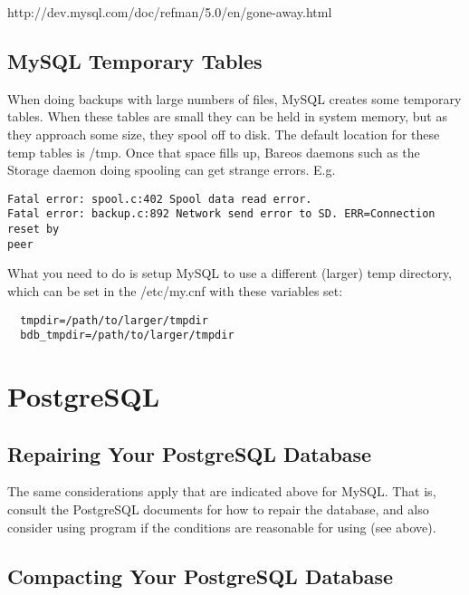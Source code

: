 {http://dev.mysql.com/doc/refman/5.0/en/gone-away.html}

\subsection{MySQL Temporary Tables}
When doing backups with large numbers of files, MySQL creates some
temporary tables.  When these tables are small they can be held in
system memory, but as they approach some size, they
spool off to disk.  The default location for these temp tables is
/tmp.  Once that space fills up, Bareos daemons such as the Storage
daemon doing spooling can get strange errors. E.g.

\footnotesize
\begin{verbatim}
Fatal error: spool.c:402 Spool data read error.
Fatal error: backup.c:892 Network send error to SD. ERR=Connection reset by
peer
\end{verbatim}
\normalsize

What you need to do is setup MySQL to use a different (larger) temp
directory, which can be set in the /etc/my.cnf with these variables
set:

\footnotesize
\begin{verbatim}
  tmpdir=/path/to/larger/tmpdir
  bdb_tmpdir=/path/to/larger/tmpdir
\end{verbatim}
\normalsize

\section{PostgreSQL}

\label{RepairingPSQL}
\subsection{Repairing Your PostgreSQL Database}

The same considerations apply that are indicated above for MySQL. That is,
consult the PostgreSQL documents for how to repair the database, and also
consider using  program if the conditions are reasonable for
using (see above).

\subsection{Compacting Your PostgreSQL Database}
\label{CompactingPostgres}

